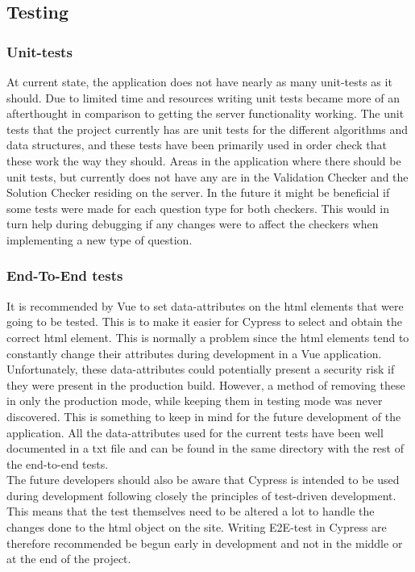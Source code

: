 \subsection{Testing}
\subsubsection{Unit-tests}
At current state, the application does not have nearly as many unit-tests as it should. Due to limited time and resources writing unit tests became more of an afterthought in comparison to getting the server functionality working. The unit tests that the project currently has are unit tests for the different algorithms and data structures, and these tests have been primarily used in order check that these work the way they should. Areas in the application where there should be unit tests, but currently does not have any are in the Validation Checker and the Solution Checker residing on the server. In the future it might be beneficial if some tests were made for each question type for both checkers. This would in turn help during debugging if any changes were to affect the checkers when implementing a new type of question.
\subsubsection{End-To-End tests}
It is recommended by Vue to set data-attributes on the html elements that were going to be tested. This is to make it easier for Cypress to select and obtain the correct html element. This is normally a problem since the html elements tend to constantly change their attributes during development in a Vue application. Unfortunately, these data-attributes could potentially present a security risk if they were present in the production build. However, a method of removing these in only the production mode, while keeping them in testing mode was never discovered. This is something to keep in mind for the future development of the application. All the data-attributes used for the current tests have been well documented in a txt file and can be found in the same directory with the rest of the end-to-end tests.\cite{Cypress:BestPractise}\\[11pt] 
The future developers should also be aware that Cypress is intended to be used during development following closely the principles of test-driven development. This means that the test themselves need to be altered a lot to handle the changes done to the html object on the site. Writing E2E-test in Cypress are therefore recommended be begun early in development and not in the middle or at the end of the project.

